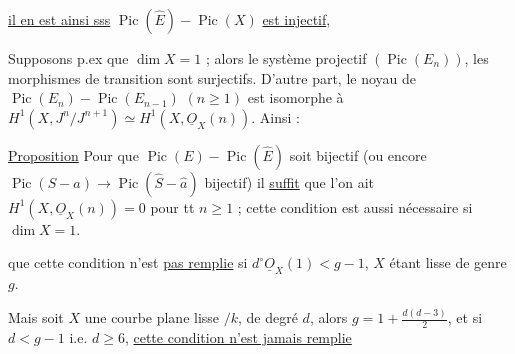 \uline{il en est ainsi sss} $\operatorname{Pic}(\widehat E)\mathbin{-}\operatorname{Pic}(X)$ \uline{est injectif}, 

Supposons p.ex que $\dim X=1$ ; alors  le système projectif $(\operatorname{Pic}(E_n))$, les morphismes de transition sont surjectifs. D'autre part,  le noyau de $\operatorname{Pic}(E_n)\mathbin{-}\operatorname{Pic}(E_{n-1})$ $(n\geq1)$ est isomorphe à $H^1(X,J^n/J^{n+1})\simeq H^1(X,\underline O_X(n))$. Ainsi : 

\uline{Proposition} Pour que $\operatorname{Pic}(E)\mathbin{-}\operatorname{Pic}(\widehat E)$ soit bijectif (ou encore $\operatorname{Pic}(S-a)\longrightarrow\operatorname{Pic}(\widehat S-\hat a)$ bijectif) il  \uline{suffit} que l'on ait $H^1(X,\underline O_X(n))=0$ pour tt $n\geq1$ ; cette condition est aussi nécessaire si $\dim X=1$.

 que cette condition n'est \uline{pas remplie} si $d^\circ\underline O_X(1)<g-1$, $X$ étant lisse  de genre $g$.

Mais soit $X$  une courbe plane lisse $/k$, de degré $d$, alors $g=1+\frac{d(d-3)}{2}$, et si $d<g-1$ i.e. $d\geq6$, \uline{cette condition n'est jamais remplie}
